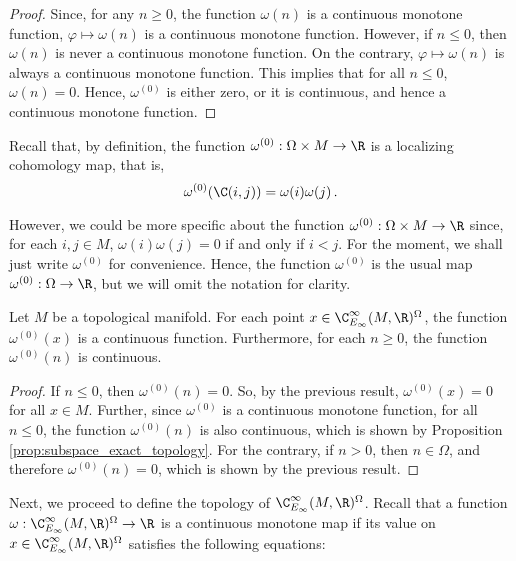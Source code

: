 \documentclass[a4paper,reqno,oneside]{article}
\begin{document}
\begin{proof}
    Since, for any $n \ge 0$, the function $\omega(n)$ is a continuous monotone function, $\varphi \mapsto \omega(n)$ is a continuous monotone function. However, if $n \le 0$, then $\omega(n)$ is never a continuous monotone function. On the contrary, $\varphi \mapsto \omega(n)$ is always a continuous monotone function. This implies that for all $n \le 0$, $\omega(n) = 0$. Hence, $\omega^{(0)}$ is either zero, or it is continuous, and hence a continuous monotone function.
\end{proof}

Recall that, by definition, the function $\omega^{(0)}: \Omega \times M \to \R$ is a localizing cohomology map, that is,
\[
    \omega^{(0)}(\C(i,j)) = \omega(i) \omega(j) \,.
\]

However, we could be more specific about the function $\omega^{(0)}: \Omega \times M \to \R$ since, for each $i,j \in M$, $\omega(i) \omega(j) = 0$ if and only if $i < j$. For the moment, we shall just write $\omega^{(0)}$ for convenience. Hence, the function $\omega^{(0)}$ is the usual map $\omega^{(0)}: \Omega \to \R$, but we will omit the notation for clarity.

\begin{proposition}\label{prop:basepoint_exact_topology}
    Let $M$ be a topological manifold. For each point $x \in \C^{\infty}_{E_\infty}(M, \R)^{\Omega}$, the function $\omega^{(0)}(x)$ is a continuous function. Furthermore, for each $n \ge 0$, the function $\omega^{(0)}(n)$ is continuous.
\end{proposition}

\begin{proof}
    If $n \le 0$, then $\omega^{(0)}(n) = 0$. So, by the previous result, $\omega^{(0)}(x) = 0$ for all $x \in M$. Further, since $\omega^{(0)}$ is a continuous monotone function, for all $n \le 0$, the function $\omega^{(0)}(n)$ is also continuous, which is shown by Proposition \ref{prop:subspace_exact_topology}. For the contrary, if $n \gt 0$, then $n \in \Omega$, and therefore $\omega^{(0)}(n) = 0$, which is shown by the previous result.
\end{proof}

Next, we proceed to define the topology of $\C^{\infty}_{E_\infty}(M, \R)^{\Omega}$. Recall that a function $\omega: \C^{\infty}_{E_\infty}(M, \R)^{\Omega} \to \R$ is a continuous monotone map if its value on $x \in \C^{\infty}_{E_\infty}(M, \R)^{\Omega}$ satisfies the following equations:
\end{document}
